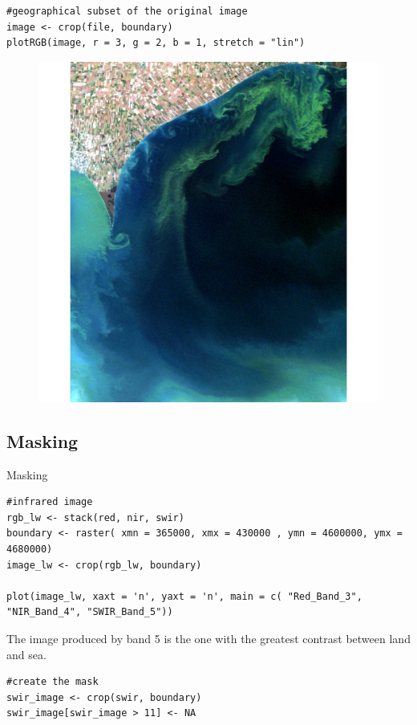 \documentclass[10pt]{beamer}
\begin{document}
\begin{frame}[fragile]{}
\begin{lstlisting}[firstnumber=17]
#geographical subset of the original image
image <- crop(file, boundary)
plotRGB(image, r = 3, g = 2, b = 1, stretch = "lin")
\end{lstlisting}
\begin{figure}
\centering
\includegraphics[width=.7\textwidth]{images/rgbTrue.pdf}
\end{figure}  
\end{frame}

\subsection{Masking}

\begin{frame}[fragile]{Masking}
\begin{lstlisting}[firstnumber=20]
#infrared image
rgb_lw <- stack(red, nir, swir)
boundary <- raster( xmn = 365000, xmx = 430000 , ymn = 4600000, ymx = 4680000)
image_lw <- crop(rgb_lw, boundary)

plot(image_lw, xaxt = 'n', yaxt = 'n', main = c( "Red_Band_3", "NIR_Band_4", "SWIR_Band_5"))
\end{lstlisting}

  The image produced by band 5 is the one with the greatest contrast between land and sea.

\begin{lstlisting}[firstnumber=26]
#create the mask 
swir_image <- crop(swir, boundary)
swir_image[swir_image > 11] <- NA
\end{lstlisting}
\end{frame}
\end{document}
